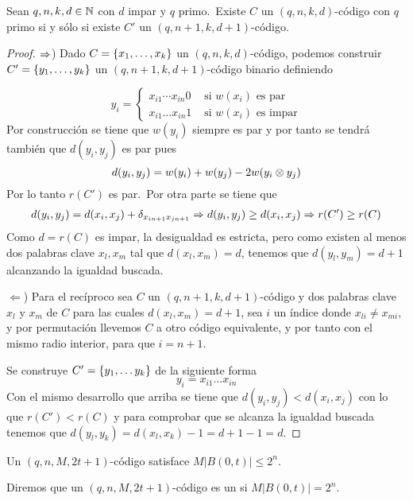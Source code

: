 \begin{lemma}
	Sean $q, n, k, d\in\mathbb{N}$ con $d$ impar y $q$ primo.\ Existe $C$ un $(q, n, k, d)$-código con $q$ primo si y sólo si existe $C'$ un $(q, n+1, k, d+1)$-código.
\end{lemma}
\begin{proof}
	$\Rightarrow$) Dado $C=\left\{x_1, \dots, x_k\right\}$ un $(q, n, k, d)$-código, podemos construir $C'=\left\{y_1,\dots, y_k\right\}$ un $(q, n+1, k, d+1)$-código binario definiendo

	\[
		y_i=\begin{cases}
			    x_{i1}\cdots x_{in}0 & \text{ si $w(x_i)$ es par}\\
			    x_{i1}\dots x_{in}1 & \text{ si $w(x_i)$ es impar}
		\end{cases}
	\]
	Por construcción se tiene que $w(y_i)$ siempre es par y por tanto se tendrá también que $d(y_i, y_j)$ es par pues
	\[
		d(y_i, y_j) = w(y_i) + w(y_j) - 2 w(y_i\otimes y_j)
	\]
	Por lo tanto $r(C')$ es par.\ Por otra parte se tiene que
	\begin{align*}
		d(y_i, y_j) = d(x_i, x_j)+\delta_{x_{in+1}x_{jn+1}}\Rightarrow d(y_i, y_j)\geq d(x_i, x_j) \Rightarrow r(C')\geq r(C)
	\end{align*}
	Como $d=r(C)$ es impar, la desigualdad es estricta, pero como existen al menos dos palabras clave $x_l, x_m$ tal que $d(x_l, x_m) = d$, tenemos que $d(y_l, y_m) = d+1$ alcanzando la igualdad buscada.

	$\Leftarrow$) Para el recíproco sea $C$ un $(q, n+1, k, d+1)$-código y dos palabras clave $x_l$ y $x_m$ de $C$  para las cuales $d(x_l, x_m) = d+1$, sea $i$ un índice donde $x_{li}\neq x_{mi}$, y por permutación llevemos $C$ a otro código equivalente, y por tanto con el mismo radio interior, para que $i=n+1$.

	Se construye $C'=\left\{y_1,\dots y_k\right\}$ de la siguiente forma
	\[
		y_i = x_{i1}\dots x_{in}
	\]
	Con el mismo desarrollo que arriba se tiene que $d(y_i, y_j) < d(x_i, x_j)$ con lo que $r(C')< r(C)$ y para comprobar que se alcanza la igualdad buscada tenemos que $d(y_l, y_k) = d(x_l, x_k)-1=d+1-1=d$.
\end{proof}

\begin{theorem}
	Un $(q, n, M, 2t+1)$-código satisface $M|B(0, t)|\leq 2^n$.
\end{theorem}

\begin{definition}
	Diremos que un $(q, n, M, 2t+1)$-código es un  si $M|B(0, t)|= 2^n$.
\end{definition}

